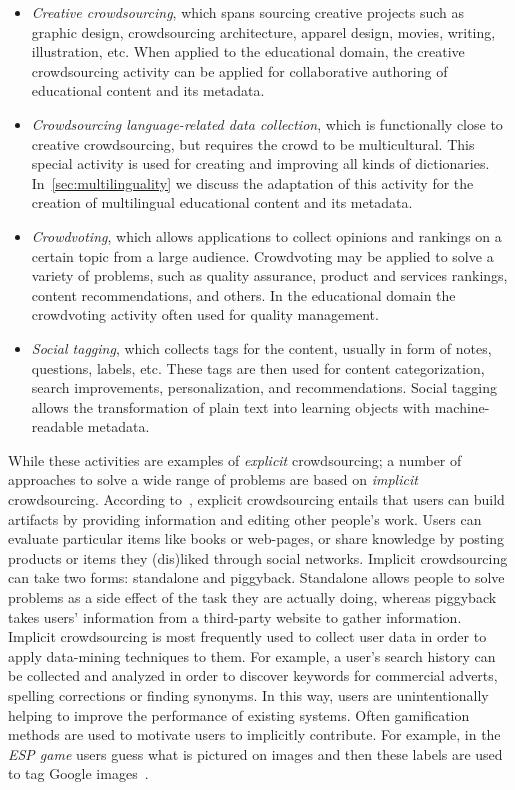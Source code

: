\documentclass[PhD, Submit, ngerman,UKenglish,table]{scrbook}
\begin{document}
\begin{itemize}
\item \emph{Creative crowdsourcing}, which spans sourcing creative projects such as graphic design, crowdsourcing architecture, apparel design, movies, writing, illustration, etc.
When applied to the educational domain, the creative crowdsourcing activity can be applied for collaborative authoring of educational content and its metadata.
\item \emph{Crowdsourcing language-related data collection}, which is functionally close to creative crowdsourcing, but requires the crowd to be multicultural.
This special activity is used for creating and improving all kinds of dictionaries.
In~\autoref{sec:multilinguality} we discuss the adaptation of this activity for the creation of multilingual educational content and its metadata.
\item \emph{Crowdvoting}, which allows applications to collect opinions and rankings on a certain topic from a large audience.
Crowdvoting may be applied to solve a variety of problems, such as quality assurance, product and services rankings, content recommendations, and others.
In the educational domain the crowdvoting activity often used for quality management.
\item \emph{Social tagging}, which collects tags for the content, usually in form of notes, questions, labels, etc. 
These tags are then used for content categorization, search improvements, personalization, and recommendations.
Social tagging allows the transformation of plain text into learning objects with machine-readable metadata. 
\end{itemize}

While these activities are examples of \emph{explicit} crowdsourcing; a number of approaches to solve a wide range of problems are based on \emph{implicit} crowdsourcing.
According to~\cite{doan2011crowdsourcing}, explicit crowdsourcing entails that users can build artifacts by providing information and editing other people's work.
Users can evaluate particular items like books or web-pages, or share knowledge by posting products or items they (dis)liked through social networks.
Implicit crowdsourcing can take two forms: standalone and piggyback.
Standalone allows people to solve problems as a side effect of the task they are actually doing, whereas piggyback takes users' information from a third-party website to gather information.
Implicit crowdsourcing is most frequently used to collect user data in order to apply data-mining techniques to them.
For example, a user's search history can be collected and analyzed in order to discover keywords for commercial adverts, spelling corrections or finding synonyms.
In this way, users are unintentionally helping to improve the performance of existing systems.
Often gamification methods are used to motivate users to implicitly contribute.
For example, in the \emph{ESP game} users guess what is pictured on images and then these labels are used to tag Google images~\cite{von2004labeling}. 
\end{document}
